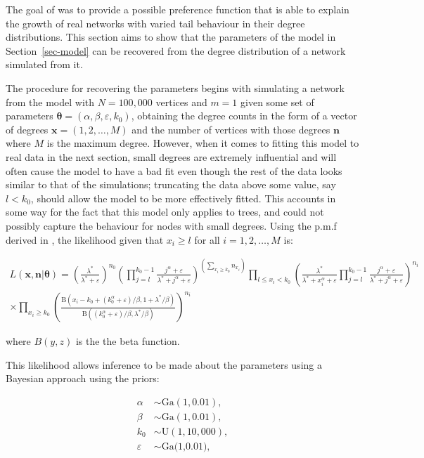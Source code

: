 \documentclass[
  sn-basic,
]{sn-jnl}
\theoremstyle{plain}
\theoremstyle{remark}
\begin{document}
The goal of was to provide a possible preference function that is able
to explain the growth of real networks with varied tail behaviour in
their degree distributions. This section aims to show that the
parameters of the model in Section~\ref{sec-model} can be recovered from
the degree distribution of a network simulated from it.

The procedure for recovering the parameters begins with simulating a
network from the model with \(N=100,000\) vertices and \(m=1\) given
some set of parameters
\(\pmb\theta = (\alpha, \beta, \varepsilon, k_0)\), obtaining the degree
counts in the form of a vector of degrees \(\pmb x = (1,2,\ldots,M)\)
and the number of vertices with those degrees \(\pmb n\) where \(M\) is
the maximum degree. However, when it comes to fitting this model to real
data in the next section, small degrees are extremely influential and
will often cause the model to have a bad fit even though the rest of the
data looks similar to that of the simulations; truncating the data above
some value, say \(l<k_0\), should allow the model to be more effectively
fitted. This accounts in some way for the fact that this model only
applies to trees, and could not possibly capture the behaviour for nodes
with small degrees. Using the p.m.f derived in \citep{rudas07}, the
likelihood given that \(x_i \ge l\) for all \(i =1,2,\ldots,M\) is:

\begin{align*}
L(\pmb x,\pmb n | \pmb \theta) = \left(\frac{\lambda^*}{\lambda^*+\varepsilon}\right)^{n_0}\left(\prod_{j=l}^{k_0-1}\frac{j^\alpha +\varepsilon}{\lambda^* + j^\alpha +\varepsilon}\right)^{\left(\sum_{x_i\ge k_0}n_{x_i}\right)} \prod_{l \le x_i<k_0}\left(\frac{\lambda^*}{\lambda^* +x_i^\alpha + \varepsilon } \prod_{j=l}^{k_0-1}\frac{j^\alpha + \varepsilon}{\lambda^* + j^\alpha + \varepsilon}\right)^{n_i}\\ \times \prod_{x_i\ge k_0}\left(\frac{\text{B}(x_i-k_0 + (k_0^\alpha + \varepsilon)/\beta,1+\lambda^*/\beta)}{\text{B}((k_0^\alpha + \varepsilon)/\beta,\lambda^*/\beta)}\right)^{n_i}
\end{align*}

where \(B(y,z)\) is the the beta function.

This likelihood allows inference to be made about the parameters using a
Bayesian approach using the priors:

\begin{align*}
\alpha&\sim \text{Ga}(1,0.01),\\
\beta &\sim  \text{Ga}(1,0.01),\\
k_0 &\sim \text{U}(1,10,000),\\
\varepsilon &\sim \text{Ga(1,0.01)},
\end{align*}
\end{document}
